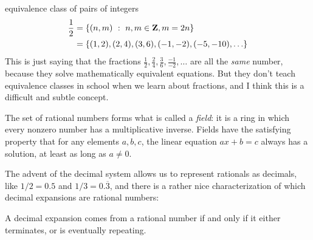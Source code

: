 \documentclass[11pt,oneside]{amsart}
\begin{document}
equivalence class of pairs of integers
\[\begin{aligned}
	\frac{1}{2} 
    & = \{ (n,m)\ :\ n,m\in \mathbf{Z}, m=2n \} \\
    & = \{ (1,2), (2,4), (3,6), (-1,-2), (-5,-10),\ldots\}
\end{aligned}
\]
This is just saying that the fractions $\frac{1}{2}, \frac{2}{4}, \frac{3}{6}, \frac{-1}{-2},\ldots$ are all the {\em same} number, because they solve mathematically equivalent
equations.  But they don't teach equivalence classes in school when we learn about fractions, and I think this is a difficult and subtle concept.

The set of rational numbers forms what is called a {\em field}: it is a ring in which every nonzero number has a multiplicative inverse.
Fields have the satisfying property that for any elements $a,b,c$, the linear equation $ax+b=c$ always has a solution, at least as long
as $a\neq 0$.

The advent of the decimal system allows us to represent rationals as decimals, like $1/2 = 0.5$ and $1/3 = 0.\overline{3}$,
and there is a rather nice characterization of which decimal expansions are rational numbers: 

\begin{proposition}\label{rat}
	A decimal expansion comes from a rational number if and only if it either terminates, or is eventually repeating.
\end{proposition}
\end{document}
